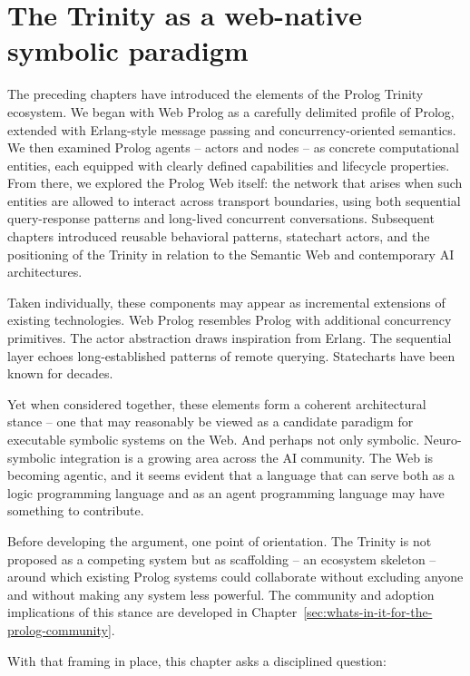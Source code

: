 \chapter{The Trinity as a web-native symbolic paradigm}\label{sec:paradigm}

The preceding chapters have introduced the elements of the Prolog Trinity ecosystem. We began with Web Prolog as a carefully delimited profile of Prolog, extended with Erlang-style message passing and concurrency-oriented semantics. We then examined Prolog agents -- actors and nodes -- as concrete computational entities, each equipped with clearly defined capabilities and lifecycle properties. From there, we explored the Prolog Web itself: the network that arises when such entities are allowed to interact across transport boundaries, using both sequential query-response patterns and long-lived concurrent conversations. Subsequent chapters introduced reusable behavioral patterns, statechart actors, and the positioning of the Trinity in relation to the Semantic Web and contemporary AI architectures.

Taken individually, these components may appear as incremental extensions of existing technologies. Web Prolog resembles Prolog with additional concurrency primitives. The actor abstraction draws inspiration from Erlang. The sequential layer echoes long-established patterns of remote querying. Statecharts have been known for decades. 

Yet when considered together, these elements form a coherent architectural stance -- one that may reasonably be viewed as a candidate paradigm for executable symbolic systems on the Web. And perhaps not only symbolic. Neuro-symbolic integration is a growing area across the AI community. The Web is becoming agentic, and it seems evident that a language that can serve both as a logic programming language and as an agent programming language may have something to contribute.

Before developing the argument, one point of orientation. The Trinity is not proposed as a competing system but as scaffolding -- an ecosystem skeleton -- around which existing Prolog systems could collaborate without excluding anyone and without making any system less powerful. The community and adoption implications of this stance are developed in Chapter~\ref{sec:whats-in-it-for-the-prolog-community}.

With that framing in place, this chapter asks a disciplined question:

